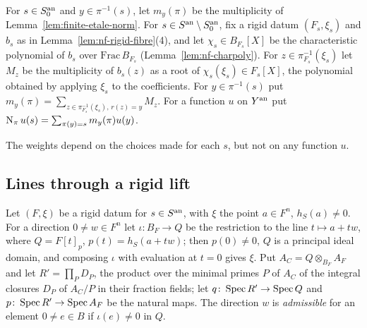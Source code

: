 \begin{definition}\label{def:nf-weights}
\leanok
{}
For $s\in S_0^{\mathrm{an}}$ and $y\in\pi^{-1}(s)$, let $m_y(\pi)$ be the multiplicity of Lemma~\ref{lem:finite-etale-norm}.
For $s\in S^{\mathrm{an}}\setminus S_0^{\mathrm{an}}$, fix a rigid datum $(F_s,\xi_s)$ and $b_s$ as in Lemma~\ref{lem:nf-rigid-fibre}(4),
and let $\chi_s\in B_{F_s}[X]$ be the characteristic polynomial of $b_s$ over $\mathrm{Frac}\,B_{F_s}$
(Lemma~\ref{lem:nf-charpoly}). For $z\in\pi_{F_s}^{-1}(\xi_s)$ let $M_z$ be the multiplicity of $b_s(z)$ as a root of
$\chi_s(\xi_s)\in F_s[X]$, the polynomial obtained by applying $\xi_s$ to the coefficients. For $y\in\pi^{-1}(s)$ put
$m_y(\pi)=\sum_{z\in\pi_{F_s}^{-1}(\xi_s),\,r(z)=y}M_z$. For a function $u$ on $Y^{\mathrm{an}}$ put
$\operatorname{N}_\pi u(s)=\sum_{\pi(y)=s}m_y(\pi)u(y)$.
\end{definition}

The weights depend on the choices made for each $s$, but not on any function $u$.

\subsection{Lines through a rigid lift}\label{subsec:nf-lines}

\begin{definition}\label{def:nf-line}
Let $(F,\xi)$ be a rigid datum for $s\in S^{\mathrm{an}}$, with $\xi$ the point $a\in F^n$, $h_S(a)\ne0$. For a direction
$0\ne w\in F^n$ let $\iota\colon B_F\to Q$ be the restriction to the line $t\mapsto a+tw$, where
$Q=F[t]_{p}$, $p(t)=h_S(a+tw)$; then $p(0)\ne0$, $Q$ is a principal ideal domain, and composing $\iota$ with evaluation
at $t=0$ gives $\xi$. Put $A_C=Q\otimes_{B_F}A_F$ and let $R'=\prod_PD_P$, the product over the minimal primes $P$ of
$A_C$ of the integral closures $D_P$ of $A_C/P$ in their fraction fields; let $q\colon\operatorname{Spec} R'\to\operatorname{Spec} Q$ and
$p\colon\operatorname{Spec} R'\to\operatorname{Spec} A_F$ be the natural maps. The direction $w$ is \emph{admissible} for an element
$0\ne e\in B$ if $\iota(e)\ne0$ in $Q$.
\end{definition}

